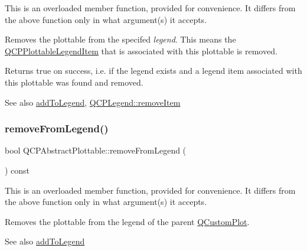 This is an overloaded member function, provided for convenience. It differs from the above function only in what argument(s) it accepts.

Removes the plottable from the specifed {\itshape legend}. This means the \mbox{\hyperlink{class_q_c_p_plottable_legend_item}{Q\+C\+P\+Plottable\+Legend\+Item}} that is associated with this plottable is removed.

Returns true on success, i.\+e. if the legend exists and a legend item associated with this plottable was found and removed.

\begin{DoxySeeAlso}{See also}
\mbox{\hyperlink{class_q_c_p_abstract_plottable_aa64e93cb5b606d8110d2cc0a349bb30f}{add\+To\+Legend}}, \mbox{\hyperlink{class_q_c_p_legend_ac91595c3eaa746fe6321d2eb952c63bb}{Q\+C\+P\+Legend\+::remove\+Item}} 
\end{DoxySeeAlso}
\mbox{\label{class_q_c_p_abstract_plottable_ac95fb2604d9106d0852ad9ceb326fe8c}} 
\subsubsection{\texorpdfstring{removeFromLegend()}{removeFromLegend()}\hspace{0.1cm}{\footnotesize\ttfamily [2/2]}}
{\footnotesize\ttfamily bool Q\+C\+P\+Abstract\+Plottable\+::remove\+From\+Legend (\begin{DoxyParamCaption}{ }\end{DoxyParamCaption}) const}

This is an overloaded member function, provided for convenience. It differs from the above function only in what argument(s) it accepts.

Removes the plottable from the legend of the parent \mbox{\hyperlink{class_q_custom_plot}{Q\+Custom\+Plot}}.

\begin{DoxySeeAlso}{See also}
\mbox{\hyperlink{class_q_c_p_abstract_plottable_aa64e93cb5b606d8110d2cc0a349bb30f}{add\+To\+Legend}} 
\end{DoxySeeAlso}
\mbox{\label{class_q_c_p_abstract_plottable_a1491c4a606bccd2d09e65e11b79eb882}} 
